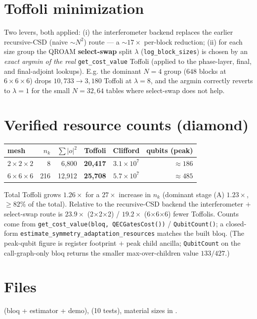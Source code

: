 \documentclass[11pt]{article}
\begin{document}
\section*{Toffoli minimization}

Two levers, both applied: (i) the interferometer backend replaces the earlier recursive-CSD
(naive $\sim N^2$) route --- a $\sim17\times$ per-block reduction; (ii) for each size group the
QROAM \textbf{select-swap} split $\lambda$ (\texttt{log\_block\_sizes}) is chosen by an
\emph{exact argmin of the real} \texttt{get\_cost\_value} Toffoli (applied to the phase-layer, final,
and final-adjoint lookups). E.g. the dominant $N=4$ group ($648$ blocks at $6\times6\times6$) drops
$10{,}733\to3{,}180$ Toffoli at $\lambda=8$, and the argmin correctly reverts to $\lambda=1$ for the
small $N=32,64$ tables where select-swap does not help.

\section*{Verified resource counts (diamond)}

\begin{center}
\begin{tabular}{lrrrrr}
\toprule
 mesh & $n_k$ & $\sum|o|^2$ & \textbf{Toffoli} & Clifford & qubits (peak) \\
\midrule
 $2\times2\times2$ & 8  & 6{,}800  & \textbf{20{,}417} & $3.1\times10^{7}$ & $\approx186$ \\
 $6\times6\times6$ & 216 & 12{,}912 & \textbf{25{,}708} & $5.7\times10^{7}$ & $\approx485$ \\
\bottomrule
\end{tabular}
\end{center}

Total Toffoli grows $1.26\times$ for a $27\times$ increase in $n_k$ (dominant stage (A) $1.23\times$,
$\ge82\%$ of the total). Relative to the recursive-CSD backend the interferometer $+$ select-swap
route is $23.9\times$ (2$\times$2$\times$2) / $19.2\times$ (6$\times$6$\times$6) fewer Toffolis.
Counts come from \texttt{get\_cost\_value(bloq, QECGatesCost())} / \texttt{QubitCount()}; a
closed-form \texttt{estimate\_symmetry\_adaptation\_resources} matches the built bloq. (The peak-qubit
figure is register footprint $+$ peak child ancilla; \texttt{QubitCount} on the call-graph-only bloq
returns the smaller max-over-children value $133/427$.)

\section*{Files}

 (bloq + estimator + demo),
 (10 tests), material sizes in
.
\end{document}
